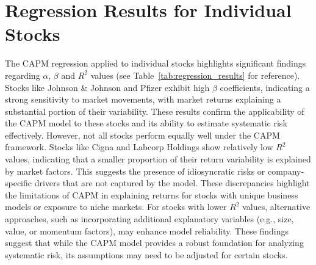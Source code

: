 \section{Regression Results for Individual Stocks}

The CAPM regression applied to individual stocks highlights significant findings regarding $\alpha$, $\beta$ and $R^2$ values 
(see Table~\ref{tab:regression_results} for reference).
Stocks like Johnson \& Johnson and Pfizer exhibit high $\beta$ coefficients, indicating a strong sensitivity to market
movements, with market returns explaining a substantial portion of their variability. These results confirm the applicability 
of the CAPM model to these stocks and its ability to estimate systematic risk effectively.
However, not all stocks perform equally well under the CAPM framework. Stocks like Cigna and Labcorp Holdings show relatively
low $R^2$ values, indicating that a smaller proportion of their return variability is explained by market factors. 
This suggests the presence of idiosyncratic risks or company-specific drivers that are not captured by the model. 
These discrepancies highlight the limitations of CAPM in explaining returns for stocks with unique business models or exposure 
to niche markets.
For stocks with lower $R^2$ values, alternative approaches, such as incorporating additional explanatory variables 
(e.g., size, value, or momentum factors), may enhance model reliability. 
These findings suggest that while the CAPM model provides a robust foundation for analyzing systematic risk, its assumptions
may need to be adjusted for certain stocks.

